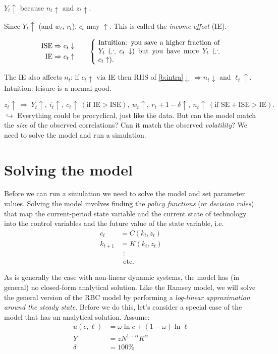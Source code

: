 \documentclass[11pt]{article}
\begin{document}
 $Y_t\uparrow$ because $n_t\uparrow$ and $z_t\uparrow$.

Since $Y_t\uparrow$ (and $w_t$, $r_t$), $c_t$ may $\uparrow$. This is called the
\emph{income effect} (IE).

\[ \begin{aligned}
   \text{ISE}&\Rightarrow c_t\downarrow\\
   \text{IE}&\Rightarrow c_t\uparrow
   \end{aligned}
   \qquad
   \left\{\ \parbox{0.5\linewidth}{Intuition: you save a higher fraction of $Y_t$
   ($\therefore c_t\downarrow$) but you have more $Y_t$ ($\therefore c_t\uparrow$).}\right. \]

 The IE also affects $n_t$: if $c_t\uparrow$ via IE then RHS of
\eqref{b:intra}$\downarrow\ \Rightarrow n_t\downarrow$ and $\ell_t\uparrow$.
Intuition: leisure is a normal good.

\[ z_t\uparrow\ \Rightarrow\ Y_t\uparrow,\ i_t\uparrow,\
   c_t\uparrow\ (\text{if IE}>\text{ISE}),\ w_t\uparrow,\
   r_t+1-\delta\uparrow,\ n_t\uparrow\ (\text{if SE}+\text{ISE}>\text{IE}). \]
$\hookrightarrow$ Everything could be procyclical, just like the data. But can the model
match the \emph{size} of the observed correlations? Can it match the observed
\emph{volatility}? We need to solve the model and run a simulation.


\section{Solving the model}

Before we can run a simulation we need to solve the model and set parameter values.
Solving the model involves finding the \emph{policy functions} (or \emph{decision rules})
that map the current-period state variable and the current state of technology into the
control variables and the future value of the state variable, i.e.
\begin{align*}
  c_t &= C(k_t,z_t)\\
  k_{t+1} &= K(k_t,z_t)\\
  &\ \ \vdots\\
  &\ \ \text{etc.}
\end{align*}

 As is generally the case with non-linear dynamic systems, the model has
(in general) no closed-form analytical solution. Like the Ramsey model, we will solve the
general version of the RBC model by performing a \emph{log-linear approximation around
the steady state}. Before we do this, let's consider a special case of the model that has
an analytical solution. Assume:
\begin{align*}
  u(c,\ell) &= \omega\ln c+(1-\omega)\ln\ell\\
  Y &= zN^{1-\alpha}K^{\alpha}\\
  \delta &= 100\%
\end{align*}
\end{document}
